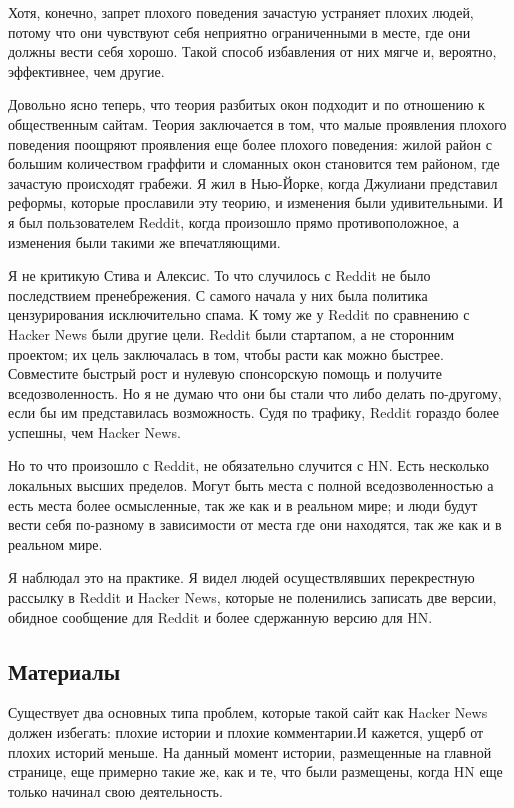 \documentclass[ebook,12pt,oneside,openany]{memoir}
\begin{document}
Хотя, конечно, запрет плохого поведения зачастую устраняет плохих
людей, потому что они чувствуют себя неприятно ограниченными в месте,
где они должны вести себя хорошо. Такой способ избавления от них мягче
и, вероятно, эффективнее, чем другие. \newline

Довольно ясно теперь, что теория разбитых окон подходит и по отношению
к общественным сайтам. Теория заключается в том, что малые проявления
плохого поведения поощряют проявления еще более плохого поведения:
жилой район с большим количеством граффити и сломанных окон становится
тем районом, где зачастую происходят грабежи. Я жил в Нью-Йорке, когда
Джулиани представил реформы, которые прославили эту теорию, и
изменения были удивительными. И я был пользователем Reddit, когда
произошло прямо противоположное, а изменения были такими же
впечатляющими. \newline

Я не критикую Стива и Алексис. То что случилось с Reddit не было
последствием пренебрежения. С самого начала у них была политика
цензурирования исключительно спама. К тому же у Reddit по сравнению с
Hacker News были другие цели. Reddit были стартапом, а не сторонним
проектом; их цель заключалась в том, чтобы расти как можно быстрее.
Совместите быстрый рост и нулевую спонсорскую помощь и получите
вседозволенность. Но я не думаю что они бы стали что либо делать
по-другому, если бы им представилась возможность. Судя по трафику,
Reddit гораздо более успешны, чем Hacker News. \newline

Но то что произошло с Reddit, не обязательно случится с HN. Есть
несколько локальных высших пределов. Могут быть места с полной
вседозволенностью а есть места более осмысленные, так же как и в
реальном мире; и люди будут вести себя по-разному в зависимости от
места где они находятся, так же как и в реальном мире. \newline

Я наблюдал это на практике. Я видел людей осуществлявших перекрестную
рассылку в Reddit и Hacker News, которые не поленились записать две
версии, обидное сообщение для Reddit и более сдержанную версию для HN. \newline

\subsection{Материалы}

Существует два основных типа проблем, которые такой сайт как Hacker
News должен избегать: плохие истории и плохие комментарии.И кажется,
ущерб от плохих историй меньше. На данный момент истории, размещенные
на главной странице, еще примерно такие же, как и те, что были
размещены, когда HN еще только начинал свою деятельность. \newline
\end{document}
